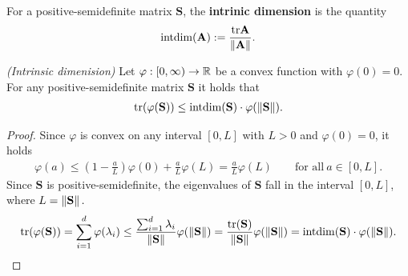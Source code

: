 \begin{definition}
  \label{rmineq_intrinsic_bernstein}
  For a positive-semidefinite matrix $\mathbf{S}$,
  the \textbf{intrinic dimension} is the quantity
  \begin{gather*}
    \mathrm{intdim}
    (\mathbf{A})
    :=
    \frac{\mathrm{tr}\mathbf{A}}{\left\lVert\mathbf{A}\right\rVert}
    .
  \end{gather*}
\end{definition}
\begin{lemma}
  \emph{(Intrinsic dimenision)}
  Let 
  $
    \varphi: [0,\infty) \to \mathbb{R}
  $
  be a convex function with
  $
    \varphi(0)=0.
  $
  For any positive-semidefinite matrix $\mathbf{S}$ it holds that
  \begin{gather*}
    \mathrm{tr}(\varphi(\mathbf{S}))
    \le
    \mathrm{intdim}(\mathbf{S})
    \cdot
    \varphi(\left\lVert\mathbf{S}\right\rVert)
    .
  \end{gather*}
\end{lemma}
\begin{proof}
  \emph{\cite[Lemma~7.5.1]{Tropp2015}}
  Since $\varphi$ is convex on any interval $[0,L]$ with $L>0$ and $\varphi(0)=0$, it holds
  \begin{gather}
    \varphi(a)
    \le
    \left( 
      1 - \frac{a}{L}
    \right)
    \varphi(0)
    +
    \frac{a}{L}
    \varphi(L)
    =
    \frac{a}{L}
    \varphi(L)
    \qquad
    \text{for all}\ 
    a \in [0,L]
    .
  \end{gather}
  Since $\mathbf{S}$ is positive-semidefinite, the eigenvalues of $\mathbf{S}$ 
  fall in the interval $[0,L]$, where $L=\left\lVert\mathbf{S}\right\rVert.$
  \begin{gather}
    \mathrm{tr}(\varphi(\mathbf{S}))
    =
    \sum_{i=1}^{d}
    \varphi(\lambda_i)
    \le
    \frac{
    \sum_{i=1}^{d}
    \lambda_i
    }{\left\lVert\mathbf{S}\right\rVert}
    \varphi(\left\lVert\mathbf{S}\right\rVert)
    =
    \frac{\mathrm{tr}(\mathbf{S})}{\left\lVert\mathbf{S}\right\rVert}
    \varphi(\left\lVert\mathbf{S}\right\rVert)
    =
    \mathrm{intdim}(\mathbf{S})
    \cdot
    \varphi(\left\lVert\mathbf{S}\right\rVert)
    .
  \end{gather}
\end{proof}
